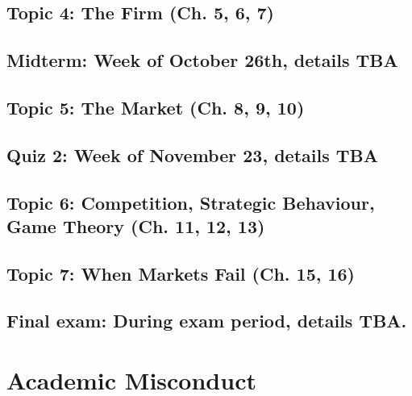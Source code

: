 \documentclass[11pt,]{article}
\begin{document}
\hypertarget{topic-4-the-firm-ch.-5-6-7}{%
\subsection{Topic 4: The Firm (Ch. 5, 6,
7)}\label{topic-4-the-firm-ch.-5-6-7}}

\hypertarget{midterm-week-of-october-26th-details-tba}{%
\subsection{Midterm: Week of October 26th, details
TBA}\label{midterm-week-of-october-26th-details-tba}}

\hypertarget{topic-5-the-market-ch.-8-9-10}{%
\subsection{Topic 5: The Market (Ch. 8, 9,
10)}\label{topic-5-the-market-ch.-8-9-10}}

\hypertarget{quiz-2-week-of-november-23-details-tba}{%
\subsection{Quiz 2: Week of November 23, details
TBA}\label{quiz-2-week-of-november-23-details-tba}}

\hypertarget{topic-6-competition-strategic-behaviour-game-theory-ch.-11-12-13}{%
\subsection{Topic 6: Competition, Strategic Behaviour, Game Theory (Ch.
11, 12,
13)}\label{topic-6-competition-strategic-behaviour-game-theory-ch.-11-12-13}}

\hypertarget{topic-7-when-markets-fail-ch.-15-16}{%
\subsection{Topic 7: When Markets Fail (Ch. 15,
16)}\label{topic-7-when-markets-fail-ch.-15-16}}

\hypertarget{final-exam-during-exam-period-details-tba.}{%
\subsection{Final exam: During exam period, details
TBA.}\label{final-exam-during-exam-period-details-tba.}}

\newpage

\hypertarget{academic-misconduct}{%
\section{Academic Misconduct}\label{academic-misconduct}}
\end{document}
